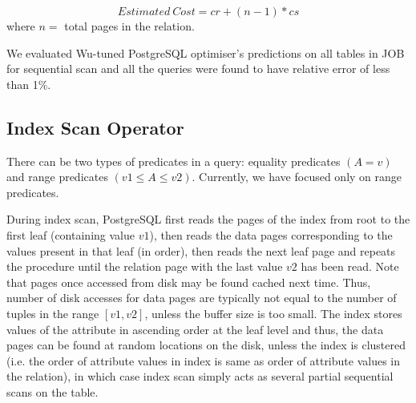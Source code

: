 \documentclass{article}
\begin{document}
\begin{multicols}{2}
	\[Estimated\ Cost = cr + (n-1)*cs\]
	where $n =$ total pages in the relation.
	

	
	We evaluated Wu-tuned PostgreSQL optimiser's predictions on all tables in JOB for sequential scan and all the queries were found to have relative error of less than 1\%.
	
	\subsection{Index Scan Operator}	
There can be two types of predicates in a query: equality predicates $(A = v)$ and range predicates $(v1 \leq{A} \leq{v2})$. Currently, we have focused only on range predicates.

During index scan, PostgreSQL first reads the pages of the index from root to the first leaf (containing value $v1$), then reads the data pages corresponding to the values present in that leaf (in order), then reads the next leaf page and repeats the procedure until the relation page with the last value $v2$ has been read. Note that pages once accessed from disk may be found cached next time. Thus, number of disk accesses for data pages are typically not equal to the number of tuples in the range $[v1,v2]$, unless the buffer size is too small. The index stores values of the attribute in ascending order at the leaf level and thus, the data pages can be found at random locations on the disk, unless the index is clustered (i.e. the order of attribute values in index is same as order of attribute values in the relation), in which case index scan simply acts as several partial sequential scans on the table.

\end{multicols}
\end{document}

